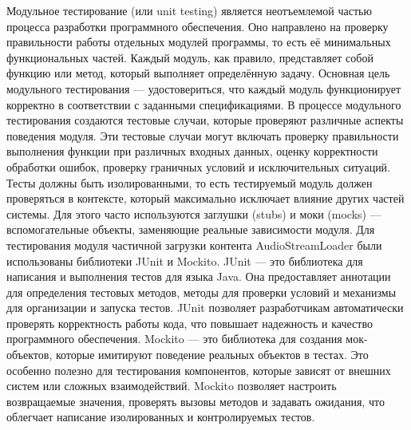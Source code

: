 Модульное тестирование (или unit testing) является неотъемлемой частью процесса разработки программного обеспечения. Оно направлено на проверку правильности работы отдельных модулей программы, то есть её минимальных функциональных частей. Каждый модуль, как правило, представляет собой функцию или метод, который выполняет определённую задачу. Основная цель модульного тестирования — удостовериться, что каждый модуль функционирует корректно в соответствии с заданными спецификациями.
В процессе модульного тестирования создаются тестовые случаи, которые проверяют различные аспекты поведения модуля. Эти тестовые случаи могут включать проверку правильности выполнения функции при различных входных данных, оценку корректности обработки ошибок, проверку граничных условий и исключительных ситуаций. Тесты должны быть изолированными, то есть тестируемый модуль должен проверяться в контексте, который максимально исключает влияние других частей системы. Для этого часто используются заглушки (stubs) и моки (mocks) — вспомогательные объекты, заменяющие реальные зависимости модуля.
Для тестирования модуля частичной загрузки контента AudioStreamLoader были использованы библиотеки JUnit и Mockito.
JUnit — это библиотека для написания и выполнения тестов для языка Java. Она предоставляет аннотации для определения тестовых методов, методы для проверки условий и механизмы для организации и запуска тестов. JUnit позволяет разработчикам автоматически проверять корректность работы кода, что повышает надежность и качество программного обеспечения.
Mockito — это библиотека для создания мок-объектов, которые имитируют поведение реальных объектов в тестах. Это особенно полезно для тестирования компонентов, которые зависят от внешних систем или сложных взаимодействий. Mockito позволяет настроить возвращаемые значения, проверять вызовы методов и задавать ожидания, что облегчает написание изолированных и контролируемых тестов.

